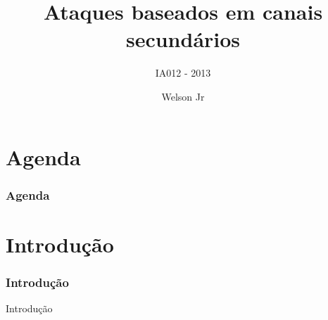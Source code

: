\documentclass[pdf]{beamer}
\author{Welson Jr}
\title{Ataques baseados em canais secundários}
\subtitle{IA012 - 2013}
\begin{document}
\begin{frame}
\transdissolve
\maketitle
\end{frame}
\section{Agenda}
\begin{frame}
\frametitle{Agenda}
\transdissolve
	\tableofcontents
\end{frame}
\section{Introdução}
\begin{frame}
\frametitle{Introdução}
Introdução
\end{frame}
\end{document}

